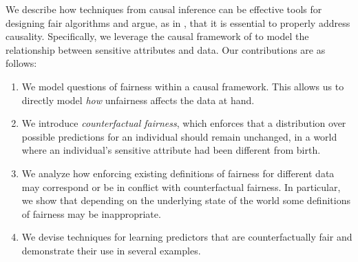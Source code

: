 % 

We describe how techniques from causal inference can be effective tools for designing fair algorithms and argue, as in \cite{dedeo2014wrong}, that it is essential to properly address causality.
Specifically, we
leverage the causal framework of 
\citet{pearl2009causal} to model the relationship between sensitive
attributes and data. Our contributions are as follows:
\begin{enumerate}
    \item We model questions of fairness within a causal framework. This allows us to directly model \emph{how} unfairness affects the data at hand.
    \item We introduce \emph{counterfactual fairness}, which enforces that a distribution over possible predictions for an individual should remain unchanged, in a world where an individual's sensitive attribute had been different from birth.
    \item We analyze how enforcing existing definitions of fairness for different data may correspond or be in conflict with counterfactual fairness. In particular, we show that depending on the underlying state of the world some definitions of fairness may be inappropriate.
    \item We devise techniques for learning predictors that are counterfactually fair and demonstrate their use in several examples.
\end{enumerate}





